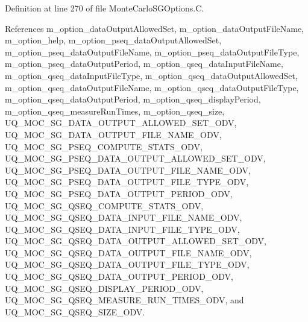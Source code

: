 Definition at line 270 of file Monte\-Carlo\-S\-G\-Options.\-C.



References m\-\_\-option\-\_\-data\-Output\-Allowed\-Set, m\-\_\-option\-\_\-data\-Output\-File\-Name, m\-\_\-option\-\_\-help, m\-\_\-option\-\_\-pseq\-\_\-data\-Output\-Allowed\-Set, m\-\_\-option\-\_\-pseq\-\_\-data\-Output\-File\-Name, m\-\_\-option\-\_\-pseq\-\_\-data\-Output\-File\-Type, m\-\_\-option\-\_\-pseq\-\_\-data\-Output\-Period, m\-\_\-option\-\_\-qseq\-\_\-data\-Input\-File\-Name, m\-\_\-option\-\_\-qseq\-\_\-data\-Input\-File\-Type, m\-\_\-option\-\_\-qseq\-\_\-data\-Output\-Allowed\-Set, m\-\_\-option\-\_\-qseq\-\_\-data\-Output\-File\-Name, m\-\_\-option\-\_\-qseq\-\_\-data\-Output\-File\-Type, m\-\_\-option\-\_\-qseq\-\_\-data\-Output\-Period, m\-\_\-option\-\_\-qseq\-\_\-display\-Period, m\-\_\-option\-\_\-qseq\-\_\-measure\-Run\-Times, m\-\_\-option\-\_\-qseq\-\_\-size, U\-Q\-\_\-\-M\-O\-C\-\_\-\-S\-G\-\_\-\-D\-A\-T\-A\-\_\-\-O\-U\-T\-P\-U\-T\-\_\-\-A\-L\-L\-O\-W\-E\-D\-\_\-\-S\-E\-T\-\_\-\-O\-D\-V, U\-Q\-\_\-\-M\-O\-C\-\_\-\-S\-G\-\_\-\-D\-A\-T\-A\-\_\-\-O\-U\-T\-P\-U\-T\-\_\-\-F\-I\-L\-E\-\_\-\-N\-A\-M\-E\-\_\-\-O\-D\-V, U\-Q\-\_\-\-M\-O\-C\-\_\-\-S\-G\-\_\-\-P\-S\-E\-Q\-\_\-\-C\-O\-M\-P\-U\-T\-E\-\_\-\-S\-T\-A\-T\-S\-\_\-\-O\-D\-V, U\-Q\-\_\-\-M\-O\-C\-\_\-\-S\-G\-\_\-\-P\-S\-E\-Q\-\_\-\-D\-A\-T\-A\-\_\-\-O\-U\-T\-P\-U\-T\-\_\-\-A\-L\-L\-O\-W\-E\-D\-\_\-\-S\-E\-T\-\_\-\-O\-D\-V, U\-Q\-\_\-\-M\-O\-C\-\_\-\-S\-G\-\_\-\-P\-S\-E\-Q\-\_\-\-D\-A\-T\-A\-\_\-\-O\-U\-T\-P\-U\-T\-\_\-\-F\-I\-L\-E\-\_\-\-N\-A\-M\-E\-\_\-\-O\-D\-V, U\-Q\-\_\-\-M\-O\-C\-\_\-\-S\-G\-\_\-\-P\-S\-E\-Q\-\_\-\-D\-A\-T\-A\-\_\-\-O\-U\-T\-P\-U\-T\-\_\-\-F\-I\-L\-E\-\_\-\-T\-Y\-P\-E\-\_\-\-O\-D\-V, U\-Q\-\_\-\-M\-O\-C\-\_\-\-S\-G\-\_\-\-P\-S\-E\-Q\-\_\-\-D\-A\-T\-A\-\_\-\-O\-U\-T\-P\-U\-T\-\_\-\-P\-E\-R\-I\-O\-D\-\_\-\-O\-D\-V, U\-Q\-\_\-\-M\-O\-C\-\_\-\-S\-G\-\_\-\-Q\-S\-E\-Q\-\_\-\-C\-O\-M\-P\-U\-T\-E\-\_\-\-S\-T\-A\-T\-S\-\_\-\-O\-D\-V, U\-Q\-\_\-\-M\-O\-C\-\_\-\-S\-G\-\_\-\-Q\-S\-E\-Q\-\_\-\-D\-A\-T\-A\-\_\-\-I\-N\-P\-U\-T\-\_\-\-F\-I\-L\-E\-\_\-\-N\-A\-M\-E\-\_\-\-O\-D\-V, U\-Q\-\_\-\-M\-O\-C\-\_\-\-S\-G\-\_\-\-Q\-S\-E\-Q\-\_\-\-D\-A\-T\-A\-\_\-\-I\-N\-P\-U\-T\-\_\-\-F\-I\-L\-E\-\_\-\-T\-Y\-P\-E\-\_\-\-O\-D\-V, U\-Q\-\_\-\-M\-O\-C\-\_\-\-S\-G\-\_\-\-Q\-S\-E\-Q\-\_\-\-D\-A\-T\-A\-\_\-\-O\-U\-T\-P\-U\-T\-\_\-\-A\-L\-L\-O\-W\-E\-D\-\_\-\-S\-E\-T\-\_\-\-O\-D\-V, U\-Q\-\_\-\-M\-O\-C\-\_\-\-S\-G\-\_\-\-Q\-S\-E\-Q\-\_\-\-D\-A\-T\-A\-\_\-\-O\-U\-T\-P\-U\-T\-\_\-\-F\-I\-L\-E\-\_\-\-N\-A\-M\-E\-\_\-\-O\-D\-V, U\-Q\-\_\-\-M\-O\-C\-\_\-\-S\-G\-\_\-\-Q\-S\-E\-Q\-\_\-\-D\-A\-T\-A\-\_\-\-O\-U\-T\-P\-U\-T\-\_\-\-F\-I\-L\-E\-\_\-\-T\-Y\-P\-E\-\_\-\-O\-D\-V, U\-Q\-\_\-\-M\-O\-C\-\_\-\-S\-G\-\_\-\-Q\-S\-E\-Q\-\_\-\-D\-A\-T\-A\-\_\-\-O\-U\-T\-P\-U\-T\-\_\-\-P\-E\-R\-I\-O\-D\-\_\-\-O\-D\-V, U\-Q\-\_\-\-M\-O\-C\-\_\-\-S\-G\-\_\-\-Q\-S\-E\-Q\-\_\-\-D\-I\-S\-P\-L\-A\-Y\-\_\-\-P\-E\-R\-I\-O\-D\-\_\-\-O\-D\-V, U\-Q\-\_\-\-M\-O\-C\-\_\-\-S\-G\-\_\-\-Q\-S\-E\-Q\-\_\-\-M\-E\-A\-S\-U\-R\-E\-\_\-\-R\-U\-N\-\_\-\-T\-I\-M\-E\-S\-\_\-\-O\-D\-V, and U\-Q\-\_\-\-M\-O\-C\-\_\-\-S\-G\-\_\-\-Q\-S\-E\-Q\-\_\-\-S\-I\-Z\-E\-\_\-\-O\-D\-V.



